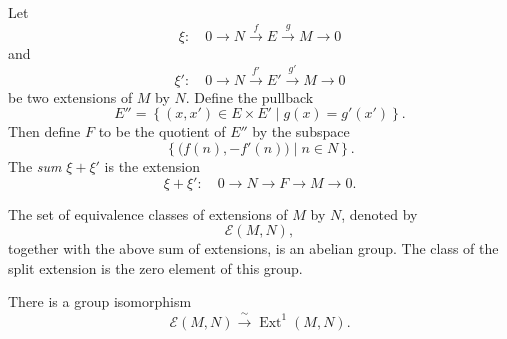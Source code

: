 \documentclass[11pt, a4paper]{report}
\begin{document}
    \begin{definition}
    Let
    \[
        \xi:\quad
        0
        \longrightarrow
        N
        \xrightarrow{f}
        E
        \xrightarrow{g}
        M
        \longrightarrow
        0
    \]
    and
    \[
        \xi':\quad
        0
        \longrightarrow
        N
        \xrightarrow{f'}
        E'
        \xrightarrow{g'}
        M
        \longrightarrow
        0
    \]
    be two extensions of \(M\) by \(N\). Define the pullback
    \[
        E''
        =
        \left\{
            (x,x')\in E\times E'
            \mid
            g(x)=g'(x')
        \right\}.
    \]
    Then define \(F\) to be the quotient of \(E''\) by the subspace
    \[
        \left\{
            \bigl(f(n),-f'(n)\bigr)
            \mid
            n\in N
        \right\}.
    \]
    The \emph{sum} \(\xi+\xi'\) is the extension
    \[
        \xi+\xi':\quad
        0
        \longrightarrow
        N
        \longrightarrow
        F
        \longrightarrow
        M
        \longrightarrow
        0.
    \]
    \end{definition}

    \begin{remark}
    The set of equivalence classes of extensions of \(M\) by \(N\), denoted by
    \[
        \mathcal E(M,N),
    \]
    together with the above sum of extensions, is an abelian group. The class of the
    split extension is the zero element of this group.
    \end{remark}

    \begin{proposition}
    There is a group isomorphism
    \[
        \mathcal E(M,N)
        \xrightarrow{\;\sim\;}
        \operatorname{Ext}^1(M,N).
    \]
    \end{proposition}
\end{document}

